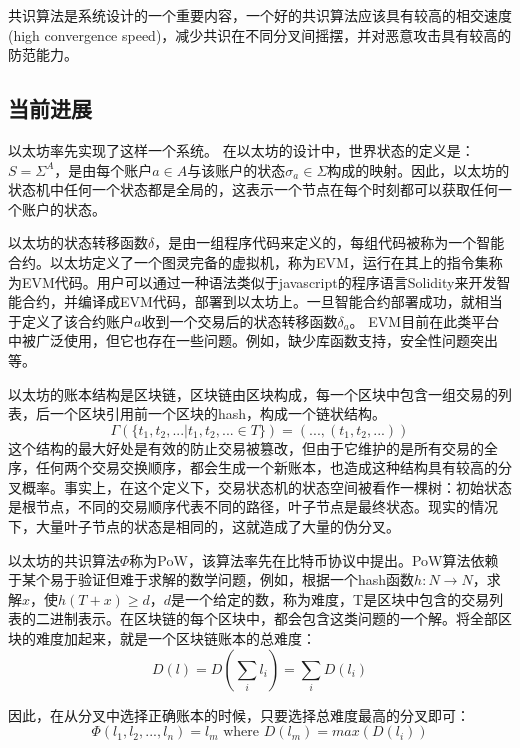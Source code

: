 \documentclass[UTF8,nofonts]{ctexart}
\begin{document}
\begin{multicols}{2}
共识算法是系统设计的一个重要内容，一个好的共识算法应该具有较高的相交速度(high convergence speed)，减少共识在不同分叉间摇摆，并对恶意攻击具有较高的防范能力。

\subsection{当前进展}
以太坊\cite{buterin2017ethereum}率先实现了这样一个系统。
在以太坊的设计中，世界状态的定义是：$S = \Sigma^{A}$，是由每个账户$a \in A$与该账户的状态$\sigma_{a} \in \Sigma$构成的映射。因此，以太坊的状态机中任何一个状态都是全局的，这表示一个节点在每个时刻都可以获取任何一个账户的状态。

以太坊的状态转移函数$\delta$，是由一组程序代码来定义的，每组代码被称为一个智能合约。以太坊定义了一个图灵完备的虚拟机，称为EVM，运行在其上的指令集称为EVM代码。用户可以通过一种语法类似于javascript的程序语言Solidity来开发智能合约，并编译成EVM代码，部署到以太坊上\cite{dannen2017introducing}。一旦智能合约部署成功，就相当于定义了该合约账户$a$收到一个交易后的状态转移函数$\delta_{a}$。
EVM目前在此类平台中被广泛使用，但它也存在一些问题。例如，缺少库函数支持，安全性问题突出等。

以太坊的账本结构是区块链\cite{nakamoto2008bitcoin}，区块链由区块构成，每一个区块中包含一组交易的列表，后一个区块引用前一个区块的hash，构成一个链状结构。
\begin{equation}
\Gamma(\lbrace t_{1}, t_{2},...\vert t_{1}, t_{2},... \in T \rbrace) = (..., (t_{1}, t_{2},...)) 
\end{equation}
这个结构的最大好处是有效的防止交易被篡改，但由于它维护的是所有交易的全序，任何两个交易交换顺序，都会生成一个新账本，也造成这种结构具有较高的分叉概率。事实上，在这个定义下，交易状态机的状态空间被看作一棵树：初始状态是根节点，不同的交易顺序代表不同的路径，叶子节点是最终状态。现实的情况下，大量叶子节点的状态是相同的，这就造成了大量的伪分叉。

以太坊的共识算法$\Phi$称为PoW，该算法率先在比特币协议中提出\cite{nakamoto2008bitcoin}。PoW算法依赖于某个易于验证但难于求解的数学问题，例如，根据一个hash函数$h:N \rightarrow N$，求解$x$，使$h(T+x) \geq d$，$d$是一个给定的数，称为难度，T是区块中包含的交易列表的二进制表示。在区块链的每个区块中，都会包含这类问题的一个解。将全部区块的难度加起来，就是一个区块链账本的总难度：
\begin{equation}
D(l) = D(\sum_{i} l_{i}) = \sum_{i} D(l_{i})
\end{equation}

因此，在从分叉中选择正确账本的时候，只要选择总难度最高的分叉即可：
\begin{equation}
 \Phi (l_{1}, l_{2}, ..., l_{n}) = l_{m} \text{ where } D(l_{m}) = max(D(l_{i}))
\end{equation}


\end{multicols}
\end{document}

